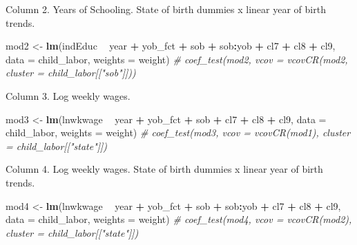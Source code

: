 \documentclass[]{book}
\newenvironment{Shaded}{\begin{snugshade}}{\end{snugshade}}
\newcommand{\CommentTok}[1]{\textcolor[rgb]{0.56,0.35,0.01}{\textit{#1}}}
\newcommand{\DataTypeTok}[1]{\textcolor[rgb]{0.13,0.29,0.53}{#1}}
\newcommand{\KeywordTok}[1]{\textcolor[rgb]{0.13,0.29,0.53}{\textbf{#1}}}
\newcommand{\NormalTok}[1]{#1}
\newcommand{\OperatorTok}[1]{\textcolor[rgb]{0.81,0.36,0.00}{\textbf{#1}}}
\newcommand{\StringTok}[1]{\textcolor[rgb]{0.31,0.60,0.02}{#1}}
\theoremstyle{definition}
\theoremstyle{definition}
\theoremstyle{definition}
\theoremstyle{remark}
\begin{document}
Column 2. Years of Schooling. State of birth dummies x linear year of
birth trends.

\begin{Shaded}
\begin{Highlighting}[]
\NormalTok{mod2 <-}\StringTok{ }\KeywordTok{lm}\NormalTok{(indEduc }\OperatorTok{~}\StringTok{ }\NormalTok{year }\OperatorTok{+}\StringTok{ }\NormalTok{yob_fct }\OperatorTok{+}\StringTok{ }\NormalTok{sob }\OperatorTok{+}\StringTok{ }\NormalTok{sob}\OperatorTok{:}\NormalTok{yob }\OperatorTok{+}\StringTok{ }\NormalTok{cl7 }\OperatorTok{+}\StringTok{ }\NormalTok{cl8 }\OperatorTok{+}\StringTok{ }\NormalTok{cl9,}
           \DataTypeTok{data =}\NormalTok{ child_labor, }\DataTypeTok{weights =}\NormalTok{ weight)}
\CommentTok{# coef_test(mod2, vcov = vcovCR(mod2, cluster = child_labor[["sob"]]))}
\end{Highlighting}
\end{Shaded}

Column 3. Log weekly wages.

\begin{Shaded}
\begin{Highlighting}[]
\NormalTok{mod3 <-}\StringTok{ }\KeywordTok{lm}\NormalTok{(lnwkwage }\OperatorTok{~}\StringTok{ }\NormalTok{year }\OperatorTok{+}\StringTok{ }\NormalTok{yob_fct }\OperatorTok{+}\StringTok{ }\NormalTok{sob }\OperatorTok{+}\StringTok{ }\NormalTok{cl7 }\OperatorTok{+}\StringTok{ }\NormalTok{cl8 }\OperatorTok{+}\StringTok{ }\NormalTok{cl9,}
           \DataTypeTok{data =}\NormalTok{ child_labor, }\DataTypeTok{weights =}\NormalTok{ weight)}
\CommentTok{# coef_test(mod3, vcov = vcovCR(mod1), cluster = child_labor[["state"]])}
\end{Highlighting}
\end{Shaded}

Column 4. Log weekly wages. State of birth dummies x linear year of
birth trends.

\begin{Shaded}
\begin{Highlighting}[]
\NormalTok{mod4 <-}\StringTok{ }\KeywordTok{lm}\NormalTok{(lnwkwage }\OperatorTok{~}\StringTok{ }\NormalTok{year }\OperatorTok{+}\StringTok{ }\NormalTok{yob_fct }\OperatorTok{+}\StringTok{ }\NormalTok{sob }\OperatorTok{+}\StringTok{ }\NormalTok{sob}\OperatorTok{:}\NormalTok{yob }\OperatorTok{+}\StringTok{ }\NormalTok{cl7 }\OperatorTok{+}\StringTok{ }\NormalTok{cl8 }\OperatorTok{+}\StringTok{ }\NormalTok{cl9,}
           \DataTypeTok{data =}\NormalTok{ child_labor, }\DataTypeTok{weights =}\NormalTok{ weight)}
\CommentTok{# coef_test(mod4, vcov = vcovCR(mod2), cluster = child_labor[["state"]])}
\end{Highlighting}
\end{Shaded}
\end{document}
